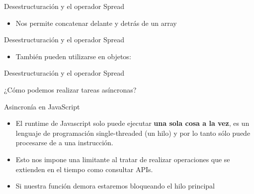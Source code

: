 \documentclass[aspectratio=43,10pt,t]{beamer}
\begin{document}
\begin{frame}{Desestructuración y el operador Spread}\relax
\begingroup
{}
\begin{itemize}
  \item Nos permite concatenar delante y detrás de un array
\end{itemize}
\endgroup
{}
\end{frame}

\begin{frame}{Desestructuración y el operador Spread}\relax
\begingroup
{}
\begin{itemize}
  \item También pueden utilizarse en objetos:
\end{itemize}
\endgroup
{}
\end{frame}

\begin{frame}{Desestructuración y el operador Spread}\relax
{}
\end{frame}

\begin{frame}{¿Cómo podemos realizar tareas asíncronas?}\relax
{}
\end{frame}

\begin{frame}{Asincronía en JavaScript}\relax
\begingroup
{}
\begin{itemize}
  \item El runtime de Javascript solo puede ejecutar \textbf{una sola cosa a la vez}, es un lenguaje de programación single-threaded (un hilo) y por lo tanto sólo puede procesarse de a una instrucción.
  \item Esto nos impone una limitante al tratar de realizar operaciones que se extienden en el tiempo como consultar APIs. 
  \item Si nuestra función demora estaremos bloqueando el hilo principal 
\end{itemize}
\endgroup
\end{frame}
\end{document}
